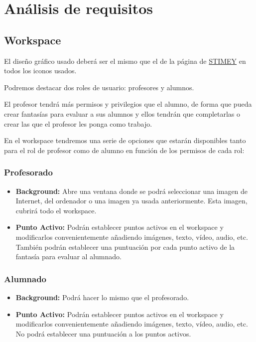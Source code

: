 \chapter{Análisis de requisitos}
\section{Workspace}
El diseño gráfico usado deberá ser el mismo que el de la página de \href{https://stimey.eu/home}{STIMEY} en todos los iconos usados.

Podremos destacar dos roles de usuario: profesores y alumnos.

El profesor tendrá más permisos y privilegios que el alumno, de forma que pueda crear fantasías para evaluar a sus alumnos y ellos tendrán que completarlas o crear las que el profesor les ponga como trabajo.

En el workspace tendremos una serie de opciones que estarán disponibles tanto para el rol de profesor como de alumno en función de los permisos de cada rol:

\subsection{Profesorado}
\begin{itemize}
	\item \textbf{Background:} Abre una ventana donde se podrá seleccionar una imagen de Internet, del ordenador o una imagen ya usada anteriormente. Esta imagen, cubrirá todo el workspace.
	\item \textbf{Punto Activo:} Podrán establecer puntos activos en el workspace y modificarlos convenientemente añadiendo imágenes, texto, vídeo, audio, etc. También podrán establecer una puntuación por cada punto activo de la fantasía para evaluar al alumnado.
\end{itemize}

\subsection{Alumnado}
\begin{itemize}
	\item \textbf{Background:} Podrá hacer lo mismo que el profesorado.
	\item \textbf{Punto Activo:} Podrán establecer puntos activos en el workspace y modificarlos convenientemente añadiendo imágenes, texto, vídeo, audio, etc. No podrá establecer una puntuación a los puntos activos.
\end{itemize}

